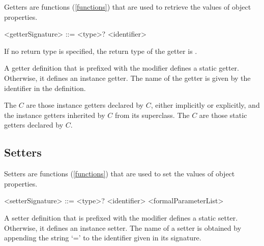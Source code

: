 \documentclass[makeidx]{article}
\begin{document}
\LMHash{}%
Getters are functions (\ref{functions}) that are used
to retrieve the values of object properties.

\begin{grammar}
<getterSignature> ::= <type>? \GET{} <identifier>
\end{grammar}

\LMHash{}%
If no return type is specified, the return type of the getter is \DYNAMIC.

\LMHash{}%
A getter definition that is prefixed with the \STATIC{} modifier defines
a static getter.
Otherwise, it defines an instance getter.
The name of the getter is given by the identifier in the definition.

\LMHash{}%
The  $C$ are
those instance getters declared by $C$,
either implicitly or explicitly,
and the instance getters inherited by $C$ from its superclass.
The  $C$ are
those static getters declared by $C$.



\subsection{Setters}

\LMHash{}%
Setters are functions (\ref{functions}) that are used to set
the values of object properties.

\begin{grammar}
<setterSignature> ::= <type>? \SET{} <identifier> <formalParameterList>
\end{grammar}


\LMHash{}%
A setter definition that is prefixed with the \STATIC{} modifier defines
a static setter.
Otherwise, it defines an instance setter.
The name of a setter is obtained by appending the string `=' to
the identifier given in its signature.

\end{document}
